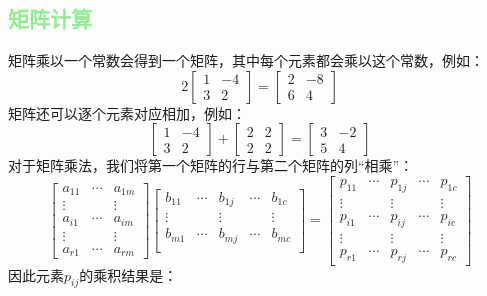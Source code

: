 \documentclass[lang=cn,12pt]{elegantbook}
\begin{document}
\subsection{\textcolor{lightgreen}{矩阵计算}}

矩阵乘以一个常数会得到一个矩阵，其中每个元素都会乘以这个常数，例如：
$$
2\left[\begin{array}{rr}
1 & -4 \\
3 & 2
\end{array}\right]=\left[\begin{array}{rr}
2 & -8 \\
6 & 4
\end{array}\right]
$$
矩阵还可以逐个元素对应相加，例如：
$$
\left[\begin{array}{rr}
1 & -4 \\
3 & 2
\end{array}\right]+\left[\begin{array}{ll}
2 & 2 \\
2 & 2
\end{array}\right]=\left[\begin{array}{rr}
3 & -2 \\
5 & 4
\end{array}\right]
$$
对于矩阵乘法，我们将第一个矩阵的行与第二个矩阵的列“相乘”：
$$
\begin{bmatrix}  
  a_{11} & \cdots & a_{1m} \\  
  \vdots & & \vdots \\  
  a_{i1} & \cdots & a_{im} \\
  \vdots & & \vdots \\ 
  a_{r1} & \cdots & a_{rm}  
\end{bmatrix}
\begin{bmatrix}  
  b_{11} & \cdots & b_{1j} & \cdots & b_{1c} \\  
  \vdots & & \vdots & & \vdots \\  
  b_{m1} & \cdots &b_{mj} &\cdots & b_{mc} \\
\end{bmatrix}
=
\begin{bmatrix}
  p_{11}&\cdots  &p_{1j}  &\cdots  &p_{1c} \\
  \vdots&  &\vdots  &  &\vdots \\
  p_{i1}&\cdots &p_{ij}  &\cdots  &p_{ic} \\
  \vdots&  &\vdots  &  &\vdots \\
  p_{r1}&\cdots  &p_{rj}  &\cdots  &p_{rc}
\end{bmatrix}
$$
因此元素$p_{ij}$的乘积结果是：
\end{document}
